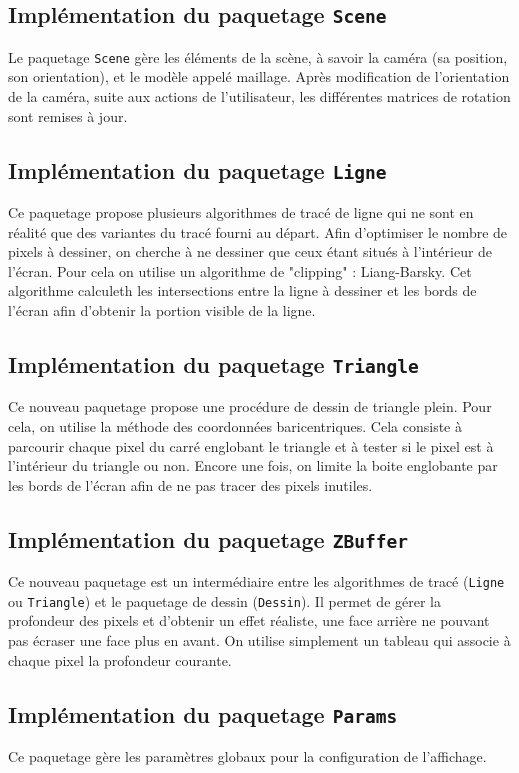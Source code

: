 \documentclass[10pt]{article}
\begin{document}
\subsection{Implémentation du paquetage {\tt Scene}}
Le paquetage {\tt Scene} gère les éléments de la scène, à savoir la caméra (sa position, son orientation), et le modèle appelé maillage.
Après modification de l'orientation de la caméra, suite aux actions de l'utilisateur, les différentes matrices de rotation sont remises à jour.

\subsection{Implémentation du paquetage {\tt Ligne}}
Ce paquetage propose plusieurs algorithmes de tracé de ligne qui ne sont en réalité que des variantes du tracé fourni au départ.
Afin d'optimiser le nombre de pixels à dessiner, on cherche à ne dessiner que ceux étant situés à l'intérieur de l'écran.
Pour cela on utilise un algorithme de "clipping" : Liang-Barsky. Cet algorithme calculeth les intersections entre la ligne à dessiner et les bords de l'écran afin d'obtenir la portion visible de la ligne.

\subsection{Implémentation du paquetage {\tt Triangle}}
Ce nouveau paquetage propose une procédure de dessin de triangle plein. Pour cela, on utilise la méthode des coordonnées baricentriques.
Cela consiste à parcourir chaque pixel du carré englobant le triangle et à tester si le pixel est à l'intérieur du triangle ou non.
Encore une fois, on limite la boite englobante par les bords de l'écran afin de ne pas tracer des pixels inutiles.

\subsection{Implémentation du paquetage {\tt ZBuffer}}
Ce nouveau paquetage est un intermédiaire entre les algorithmes de tracé ({\tt Ligne} ou {\tt Triangle})
et le paquetage de dessin ({\tt Dessin}). Il permet de gérer la profondeur des pixels et d'obtenir un effet réaliste, une face arrière ne pouvant pas écraser une face plus en avant.
On utilise simplement un tableau qui associe à chaque pixel la profondeur courante.

\subsection{Implémentation du paquetage {\tt Params}}
Ce paquetage gère les paramètres globaux pour la configuration de l'affichage.
\end{document}
